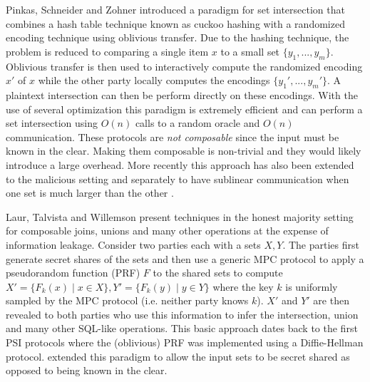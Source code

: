 Pinkas, Schneider and Zohner \cite{usenix:PSZ14} introduced a paradigm for set intersection that combines a hash table technique known as cuckoo hashing with a randomized encoding technique using oblivious transfer. Due to the hashing technique, the problem is reduced to comparing a single item $x$ to a small set $\{y_1,...,y_m\}$. Oblivious transfer is then used to interactively compute the randomized encoding $x'$ of $x$ while the other party locally computes the encodings $\{ y_1',..., y_m' \}$. A plaintext intersection can then be perform directly on these encodings. With the use of several optimization\cite{USENIX:PSSZ15,PSZ16,CCS:KKRT16,OOS17} this paradigm is extremely efficient and can perform a set intersection using $O(n)$ calls to a random oracle and $O(n)$ communication. These protocols are \emph{not composable} since the input must be known in the clear. Making them composable is non-trivial and they would likely introduce a large overhead.
\iffullversion
More recently this approach has also been extended to the malicious setting \cite{CCS:RinRos17} and separately to have sublinear communication when one set is much larger than the other\cite{CLR17} .
\fi


Laur, Talvista and Willemson\cite{LTW13} present techniques in the honest majority setting for composable joins, unions and  many other operations at the expense of information leakage. Consider two parties each with a sets $X,Y$. The parties first generate secret shares of the sets and then use a generic MPC protocol to apply a pseudorandom function (PRF) $F$ to the shared sets to compute $X' = \{F_k(x) \mid x\in X\}, Y'=\{F_k(y) \mid y\in Y\}$ where the key $k$ is uniformly sampled by the MPC protocol (i.e. neither party knows $k$). $X'$ and $Y'$ are then revealed to both parties who use this information to infer the intersection, union and many other SQL-like operations. This basic approach dates back to the first PSI protocols \cite{Mea86,HFH99} where the (oblivious) PRF was implemented using a Diffie-Hellman protocol. \cite{LTW13} extended this paradigm to allow the input sets to be secret shared as opposed to being known in the clear.

